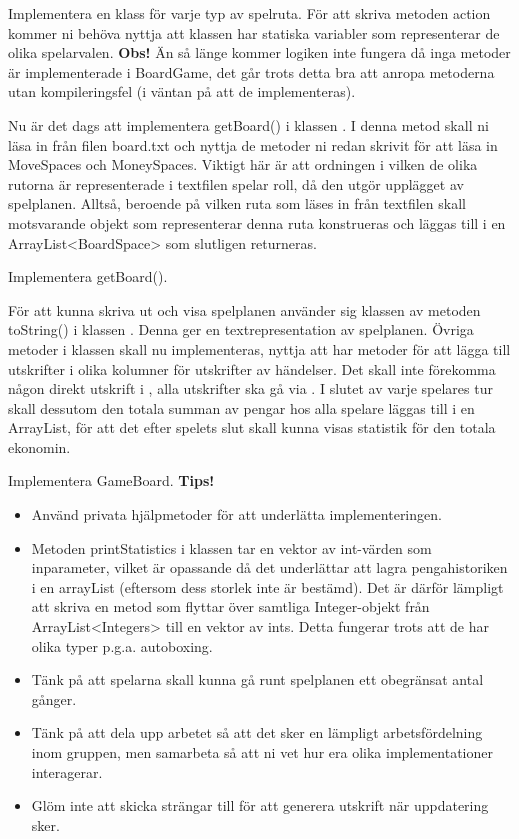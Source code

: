 \Subtask Implementera en klass för varje typ av spelruta. 
För att skriva metoden action kommer ni behöva nyttja att klassen  har statiska variabler som representerar de olika spelarvalen.
\newline
\newline
\noindent
\textbf{Obs!} Än så länge kommer logiken inte fungera då inga metoder är implementerade i BoardGame, det går trots detta bra att anropa metoderna utan kompileringsfel (i väntan på att de implementeras).


\Task Nu är det dags att implementera getBoard() i klassen . I denna metod skall ni läsa in från filen board.txt och nyttja de metoder ni redan skrivit för att läsa in MoveSpaces och MoneySpaces. Viktigt här är att ordningen i vilken de olika rutorna är representerade i textfilen spelar roll, då den utgör upplägget av spelplanen. Alltså, beroende på vilken ruta som läses in från textfilen skall motsvarande objekt som representerar denna ruta konstrueras och läggas till i en ArrayList<BoardSpace> som slutligen returneras.

\Subtask Implementera getBoard().

\Task För att kunna skriva ut och visa spelplanen använder sig klassen   av metoden toString() i klassen . Denna ger en textrepresentation av spelplanen. Övriga metoder i klassen  skall nu implementeras, nyttja att   har metoder för att lägga till utskrifter i olika kolumner för utskrifter av händelser. Det skall inte förekomma någon direkt utskrift i  , alla utskrifter ska gå via . I slutet av varje spelares tur skall dessutom den totala summan av pengar hos alla spelare läggas till i en ArrayList, för att det efter spelets slut skall kunna visas statistik för den totala ekonomin.

\Subtask Implementera GameBoard.
\newline
\newline
\textbf{Tips!} 

\begin{itemize}
\item Använd privata hjälpmetoder för att underlätta implementeringen.
\item Metoden printStatistics i klassen  tar en vektor av int-värden som inparameter, vilket är opassande då det underlättar att lagra pengahistoriken i en arrayList (eftersom dess storlek inte är bestämd). Det är därför lämpligt att skriva en metod som flyttar över samtliga Integer-objekt från ArrayList<Integers> till en vektor av ints. Detta fungerar trots att de har olika typer p.g.a. autoboxing. 
\item Tänk på att spelarna skall kunna gå runt spelplanen ett obegränsat antal gånger.
\item Tänk på att dela upp arbetet så att det sker en lämpligt arbetsfördelning inom gruppen, men samarbeta så att ni vet hur era olika implementationer interagerar.
\item Glöm inte att skicka strängar till   för att generera utskrift när uppdatering sker.
\end{itemize}




